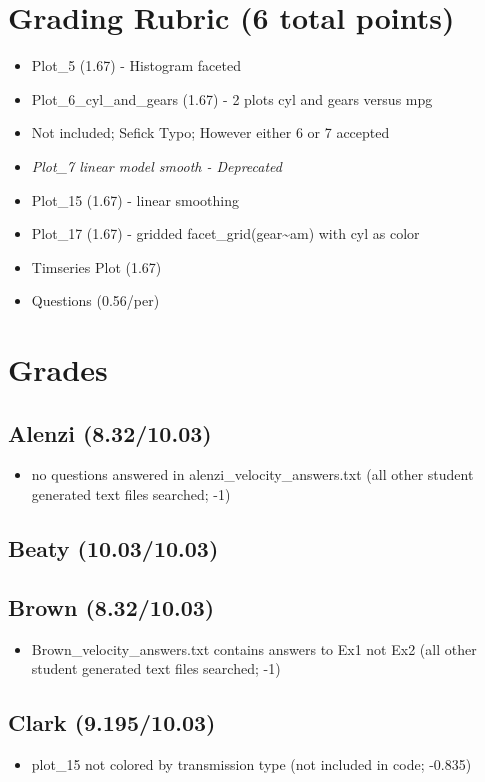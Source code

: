 \documentclass[11pt]{article}
\author{Stephen Sefick}
\date{\today}
\title{}
\begin{document}
\tableofcontents

\section{Grading Rubric (6 total points)}
\label{sec:orgheadline1}
\begin{itemize}
\item Plot\_5 (1.67) - Histogram faceted
\item Plot\_6\_cyl\_and\_gears (1.67) - 2 plots cyl and gears versus mpg
\item Not included; Sefick Typo; However either 6 or 7 accepted
\item \emph{Plot\_7 linear model smooth - Deprecated}
\item Plot\_15 (1.67) - linear smoothing
\item Plot\_17 (1.67) - gridded facet\_grid(gear\textasciitilde{}am) with cyl as color
\item Timseries Plot (1.67)
\item Questions (0.56/per)
\end{itemize}
\section{Grades}
\label{sec:orgheadline22}
\subsection{Alenzi (8.32/10.03)}
\label{sec:orgheadline2}
\begin{itemize}
\item no questions answered in alenzi\_velocity\_answers.txt (all other student generated text files searched; -1)
\end{itemize}
\subsection{Beaty (10.03/10.03)}
\label{sec:orgheadline3}
\subsection{Brown (8.32/10.03)}
\label{sec:orgheadline4}
\begin{itemize}
\item Brown\_velocity\_answers.txt contains answers to Ex1 not Ex2 (all other student generated text files searched; -1)
\end{itemize}
\subsection{Clark (9.195/10.03)}
\label{sec:orgheadline5}
\begin{itemize}
\item plot\_15 not colored by transmission type (not included in code; -0.835)
\end{itemize}
\end{document}
